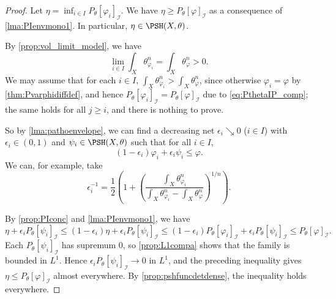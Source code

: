 \begin{proof}
    Let $\eta=\inf_{i\in I} P_{\theta}[\varphi_i]_{\mathcal{I}}$. We have $\eta\geq P_{\theta}[\varphi]_{\mathcal{I}}$ as a consequence of \cref{lma:PIenvmono1}. In particular, $\eta\in \PSH(X,\theta)$.

    By \cref{prop:vol_limit_model}, we have
    \[
        \lim_{i\in I} \int_X\theta_{\varphi_i}^n=\int_X\theta_{\varphi}^n>0.
    \]
    We may assume that for each $i\in I$, $\int_X\theta_{\varphi_i}^n>\int_X\theta_{\varphi}^n$, since otherwise $\varphi_i=\varphi$ by \cref{thm:Pvarphidiffdef}, and hence $P_{\theta}[\varphi_i]_{\mathcal{I}}=P_{\theta}[\varphi]_{\mathcal{I}}$ due to \eqref{eq:PthetaIP_comp}; the same holds for all $j\geq i$, and there is nothing to prove.

    So by \cref{lma:pathoenvelope}, we can find a decreasing net $\epsilon_i\searrow 0$ ($i\in I$) with $\epsilon_i\in (0,1)$ and $\psi_i\in \PSH(X,\theta)$ such that for all $i\in I$,
    \[
        (1-\epsilon_i) \varphi_i+\epsilon_i\psi_i\leq \varphi.
    \]
    We can, for example, take
    \[
        \epsilon_i^{-1}=\frac{1}{2}\left( 1+\left(\frac{\int_X \theta_{\varphi_i}^n}{\int_X \theta_{\varphi_i}^n-\int_X \theta_{\varphi}^n}\right)^{1/n} \right).
    \]

    By \cref{prop:PIconc} and \cref{lma:PIenvmono1}, we have
    \[
        \eta+\epsilon_i P_{\theta}[\psi_i]_{\mathcal{I}}\leq (1-\epsilon_i) \eta+\epsilon_i P_{\theta}[\psi_i]_{\mathcal{I}}\leq (1-\epsilon_i) P_{\theta}[\varphi_i]_{\mathcal{I}}+\epsilon_i P_{\theta}[\psi_i]_{\mathcal{I}}\leq P_{\theta}[\varphi]_{\mathcal{I}}.
    \]
    Each $P_{\theta}[\psi_i]_{\mathcal{I}}$ has supremum $0$, so \cref{prop:L1compa} shows that the family is bounded in $L^1$. Hence $\epsilon_iP_{\theta}[\psi_i]_{\mathcal{I}}\to 0$ in $L^1$, and the preceding inequality gives $\eta\leq P_{\theta}[\varphi]_{\mathcal{I}}$ almost everywhere. By \cref{prop:pshfuncdetdense}, the inequality holds everywhere.
\end{proof}

